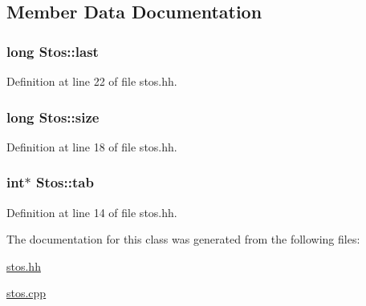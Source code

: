 \subsection{Member Data Documentation}
\hypertarget{class_stos_ae0623cdf9b6725e38da86b74972d61ba}{}
\subsubsection[{last}]{\setlength{\rightskip}{0pt plus 5cm}long Stos\+::last\hspace{0.3cm}{\ttfamily [private]}}\label{class_stos_ae0623cdf9b6725e38da86b74972d61ba}


Definition at line 22 of file stos.\+hh.

\hypertarget{class_stos_a07ba18a24f8f0dbd9144406d15bcd342}{}
\subsubsection[{size}]{\setlength{\rightskip}{0pt plus 5cm}long Stos\+::size\hspace{0.3cm}{\ttfamily [private]}}\label{class_stos_a07ba18a24f8f0dbd9144406d15bcd342}


Definition at line 18 of file stos.\+hh.

\hypertarget{class_stos_abcb666dd5a69fe50228595dc8ac4160a}{}
\subsubsection[{tab}]{\setlength{\rightskip}{0pt plus 5cm}int$\ast$ Stos\+::tab\hspace{0.3cm}{\ttfamily [private]}}\label{class_stos_abcb666dd5a69fe50228595dc8ac4160a}


Definition at line 14 of file stos.\+hh.



The documentation for this class was generated from the following files\+:\begin{DoxyCompactItemize}
\item 
\hyperlink{stos_8hh}{stos.\+hh}\item 
\hyperlink{stos_8cpp}{stos.\+cpp}\end{DoxyCompactItemize}
